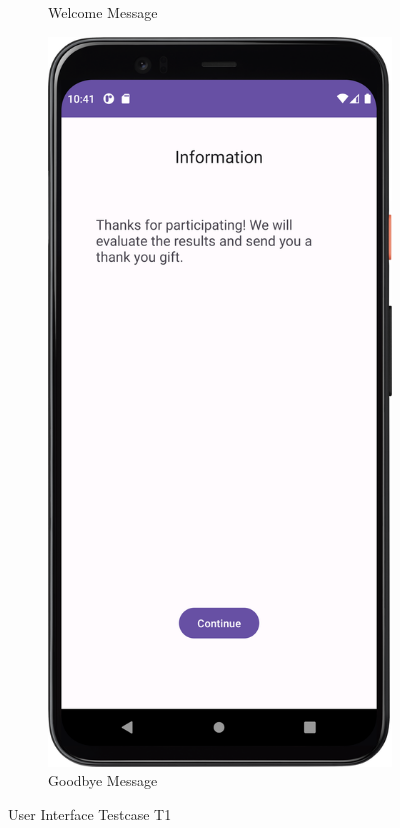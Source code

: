 \begin{figure}[htbp]
\begin{subfigure}[b]{0.25\textwidth}
        \caption{Welcome Message}
        \label{subfig:welcomeMessage}
    \end{subfigure}
    \hspace{1cm}
    \begin{subfigure}[b]{0.25\textwidth}
        \centering
        \includegraphics[width=\textwidth]{content/07_evaluation_of_the_solution/Screenshot_GoodbyeMessage.png}
        \caption{Goodbye Message}
        \label{subfig:goodbyeMessage}
    \end{subfigure}
    \caption{User Interface Testcase T1}
    \label{fig:T1}
\end{figure}


